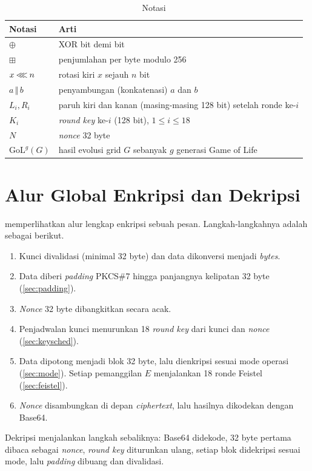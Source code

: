 \begin{table}[H]
    \centering
    \caption{Notasi}
    \label{tab:notasi}
    \begin{tabularx}{0.9\textwidth}{l Y}
        \toprule
        \textbf{Notasi} & \textbf{Arti} \\
        \midrule
        $\oplus$ & XOR bit demi bit \\
        $\boxplus$ & penjumlahan per byte modulo 256 \\
        $x \mathbin{\lll} n$ & rotasi kiri $x$ sejauh $n$ bit \\
        $a \,\Vert\, b$ & penyambungan (konkatenasi) $a$ dan $b$ \\
        $L_i, R_i$ & paruh kiri dan kanan (masing-masing 128 bit) setelah ronde ke-$i$ \\
        $K_i$ & \textit{round key} ke-$i$ (128 bit), $1 \le i \le 18$ \\
        $N$ & \textit{nonce} 32 byte \\
        $\mathrm{GoL}^g(G)$ & hasil evolusi grid $G$ sebanyak $g$ generasi Game of Life \\
        \bottomrule
    \end{tabularx}
\end{table}

\section{Alur Global Enkripsi dan Dekripsi}
 memperlihatkan alur lengkap enkripsi sebuah pesan. Langkah-langkahnya adalah sebagai berikut.
\begin{enumerate}
    \item Kunci divalidasi (minimal 32 byte) dan data dikonversi menjadi \textit{bytes}.
    \item Data diberi \textit{padding} PKCS\#7 hingga panjangnya kelipatan 32 byte (\cref{sec:padding}).
    \item \textit{Nonce} 32 byte dibangkitkan secara acak.
    \item Penjadwalan kunci menurunkan 18 \textit{round key} dari kunci dan \textit{nonce} (\cref{sec:keysched}).
    \item Data dipotong menjadi blok 32 byte, lalu dienkripsi sesuai mode operasi (\cref{sec:mode}). Setiap pemanggilan $E$ menjalankan 18 ronde Feistel (\cref{sec:feistel}).
    \item \textit{Nonce} disambungkan di depan \textit{ciphertext}, lalu hasilnya dikodekan dengan Base64.
\end{enumerate}
Dekripsi menjalankan langkah sebaliknya: Base64 didekode, 32 byte pertama dibaca sebagai \textit{nonce}, \textit{round key} diturunkan ulang, setiap blok didekripsi sesuai mode, lalu \textit{padding} dibuang dan divalidasi.

